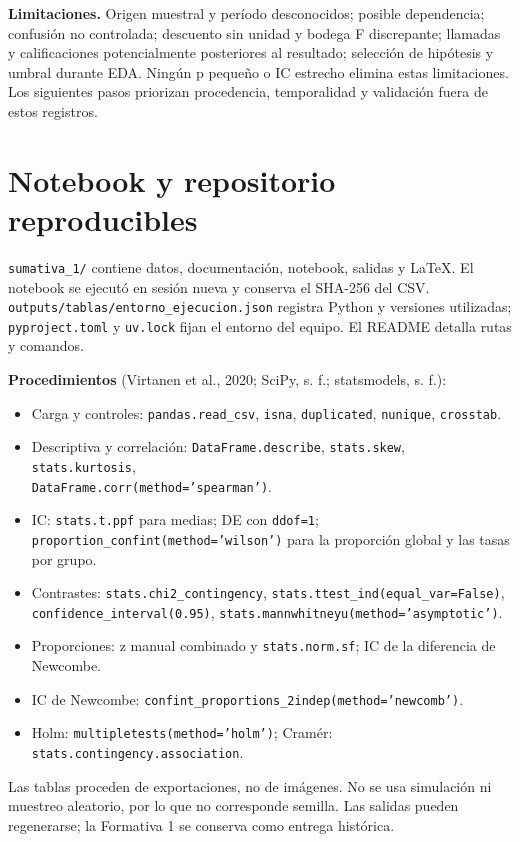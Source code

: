 \documentclass[10pt,a4paper]{article}
\newcommand{\codigo}[1]{{\footnotesize\texttt{#1}}}
\begin{document}
\textbf{Limitaciones.} Origen muestral y período desconocidos; posible dependencia; confusión no controlada; descuento sin unidad y bodega F discrepante; llamadas y calificaciones potencialmente posteriores al resultado; selección de hipótesis y umbral durante EDA. Ningún p pequeño o IC estrecho elimina estas limitaciones. Los siguientes pasos priorizan procedencia, temporalidad y validación fuera de estos registros.

\section{Notebook y repositorio reproducibles}
\codigo{sumativa\_1/} contiene datos, documentación, notebook, salidas y LaTeX. El notebook se ejecutó en sesión nueva y conserva el SHA-256 del CSV. \codigo{outputs/tablas/entorno\_ejecucion.json} registra Python y versiones utilizadas; \codigo{pyproject.toml} y \codigo{uv.lock} fijan el entorno del equipo. El README detalla rutas y comandos.

\textbf{Procedimientos} (Virtanen et al., 2020; SciPy, s. f.; statsmodels, s. f.):
\begin{itemize}\setlength{\itemsep}{0pt}\setlength{\parskip}{0pt}
\item Carga y controles: \codigo{pandas.read\_csv}, \codigo{isna}, \codigo{duplicated}, \codigo{nunique}, \codigo{crosstab}.
\item Descriptiva y correlación: \codigo{DataFrame.describe}, \codigo{stats.skew}, \codigo{stats.kurtosis},\\ \codigo{DataFrame.corr(method='spearman')}.
\item IC: \codigo{stats.t.ppf} para medias; DE con \codigo{ddof=1}; \codigo{proportion\_confint(method='wilson')} para la proporción global y las tasas por grupo.
\item Contrastes: \codigo{stats.chi2\_contingency}, \codigo{stats.ttest\_ind(equal\_var=False)},\\ \codigo{confidence\_interval(0.95)}, \codigo{stats.mannwhitneyu(method='asymptotic')}.
\item Proporciones: z manual combinado y \codigo{stats.norm.sf}; IC de la diferencia de Newcombe.
\item IC de Newcombe: \codigo{confint\_proportions\_2indep(method='newcomb')}.
\item Holm: \codigo{multipletests(method='holm')}; Cramér: \codigo{stats.contingency.association}.
\end{itemize}
Las tablas proceden de exportaciones, no de imágenes. No se usa simulación ni muestreo aleatorio, por lo que no corresponde semilla. Las salidas pueden regenerarse; la Formativa 1 se conserva como entrega histórica.
\end{document}
